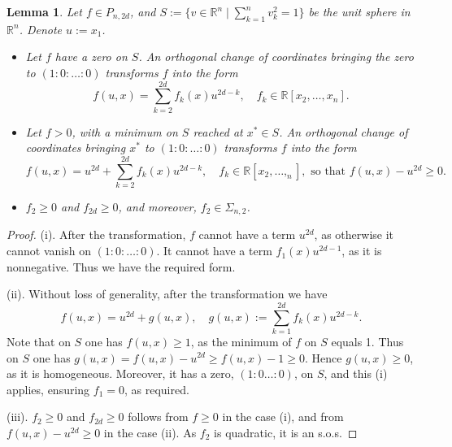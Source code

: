 \documentclass[10pt,a4paper]{amsart}
\newtheorem{lem}{Lemma}
\newcommand{\PHF}[2]{P_{{#2},{#1}}}
\newcommand{\RR}{\mathbb{R}}
\newcommand{\SosHF}[2]{\Sigma_{{#2},{#1}}}
\begin{document}
\begin{lem}\label{lem1}
Let $f\in\PHF{2d}{n}$, 
and $S:=\{v\in \RR^{n}\mid \sum_{k=1}^n v_k^2=1\}$ be the unit sphere in $\RR^{n}$. Denote $u:=x_1$.
\begin{itemize}
\item[(i)] Let $f$ have a zero on $S$.  An orthogonal change
of coordinates bringing the zero to $(1{:}0{:}\dots {:} 0)$ transforms $f$ into the form
\begin{equation}
f(u,x)=\sum_{k=2}^{2d} f_k(x) u^{2d-k}, \quad f_k\in\RR[x_2,\dots,x_n].\label{red0}
\end{equation}
\item[(ii)] Let $f>0$, with a  minimum on $S$
reached at $x^*\in S$. 
An orthogonal change of coordinates bringing $x^*$ to $(1{:}0{:}\dots {:}0)$ transforms $f$ into the form
\begin{equation}
    f(u,x)=u^{2d}+\sum_{k=2}^{2d} f_k(x) u^{2d-k}, \quad f_k\in\RR[x_2,\dots,_n],\text{ so that $f(u,x)-u^{2d}\geq 0$.}\label{rednon0}
\end{equation}
\item[(iii)] $f_2\geq 0$ and $f_{2d}\geq 0$, and moreover, $f_2\in \SosHF{2}{n}$.
\end{itemize}
\end{lem}

\begin{proof}
(i). After the transformation, $f$ cannot have a term $u^{2d}$, as otherwise
it cannot vanish on $(1{:}0{:}\dots {:}0)$. It cannot have a term $f_1(x)u^{2d-1}$, as 
it is nonnegative. Thus we have the required form.

(ii).  Without loss of generality, after the transformation we have
\[
f(u,x)=u^{2d}+g(u,x), \quad g(u,x):=\sum_{k=1}^{2d} f_k(x) u^{2d-k}.
\]
Note that on $S$ one has $f(u,x)\geq 1$, as the minimum of $f$ on $S$ equals 1.
Thus on $S$ one has $g(u,x)=f(u,x)-u^{2d}\geq f(u,x)-1\geq 0$. Hence $g(u,x)\geq 0$,
as it is homogeneous. Moreover, it has a zero, $(1{:}0\dots {:}0)$, on 
$S$, and this (i) applies, ensuring $f_1=0$, as required.

(iii). $f_2\geq 0$ and $f_{2d}\geq 0$ follows from $f\geq 0$ in the case (i), and
from $f(u,x)-u^{2d}\geq 0$ in the case (ii). As $f_2$ is quadratic, it is an s.o.s.
\end{proof}
\end{document}

